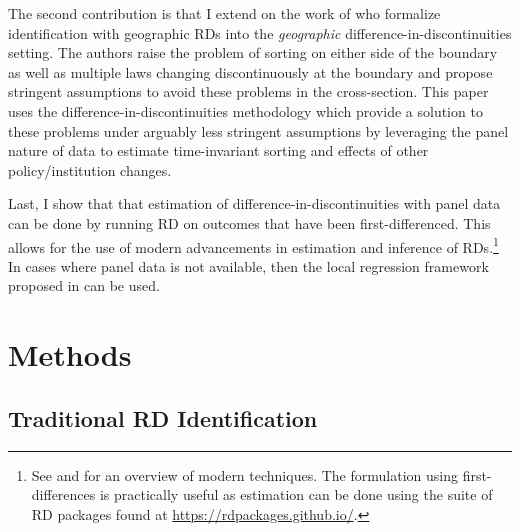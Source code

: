 \documentclass[12pt]{article}
\begin{document}
The second contribution is that I extend on the work of \citet{Keele_Titiunik_2015} who formalize identification with geographic RDs into the \emph{geographic} difference-in-discontinuities setting. The authors raise the problem of sorting on either side of the boundary as well as multiple laws changing discontinuously at the boundary and propose stringent assumptions to avoid these problems in the cross-section. This paper uses the  difference-in-discontinuities methodology which provide a solution to these problems under arguably less stringent assumptions by leveraging the panel nature of data to estimate time-invariant sorting and effects of other policy/institution changes.

Last, I show that that estimation of difference-in-discontinuities with panel data can be done by running RD on outcomes that have been first-differenced. This allows for the use of modern advancements in estimation and inference of RDs.\footnote{See \citet{Cattaneo_Idrobo_Titiunik_2019} and \citet{Cattaneo_Idrobo_Titiunik} for an overview of modern techniques. The formulation using first-differences is practically useful as estimation can be done using the suite of RD packages found at \href{https://rdpackages.github.io/}{{https://rdpackages.github.io/}}.} In cases where panel data is not available, then the local regression framework proposed in \citet{Grembi_Nannicini_Troiano_2016} can be used.

\section{Methods}

\subsection{Traditional RD Identification}
\end{document}
